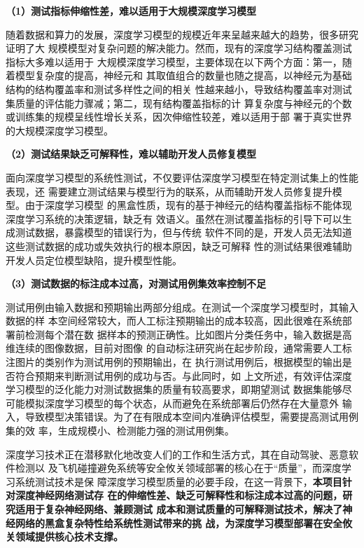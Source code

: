 \textbf{（1）测试指标伸缩性差，难以适用于大规模深度学习模型}

随着数据和算力的发展，深度学习模型的规模近年来呈越来越大的趋势，很多研究证明了大
规模模型对复杂问题的解决能力。然而，现有的深度学习结构覆盖测试指标大多难以适用于
大规模深度学习模型，主要体现在以下两个方面：第一，随着模型复杂度的提高，神经元和
其取值组合的数量也随之提高，以神经元为基础结构的结构覆盖率和测试多样性之间的相关
性越来越小，导致结构覆盖率对测试集质量的评估能力骤减；第二，现有结构覆盖指标的计
算复杂度与神经元的个数或训练集的规模呈线性增长关系，因次伸缩性较差，难以适用于部
署于真实世界的大规模深度学习模型。


\textbf{（2）测试结果缺乏可解释性，难以辅助开发人员修复模型}

面向深度学习模型的系统性测试，不仅要评估深度学习模型在特定测试集上的性能表现，还
需要建立测试结果与模型行为的联系，从而辅助开发人员修复提升模型。由于深度学习模型
的黑盒性质，现有的基于神经元的结构覆盖指标不能体现深度学习系统的决策逻辑，缺乏有
效语义。虽然在测试覆盖指标的引导下可以生成测试数据，暴露模型的错误行为，但与传统
软件不同的是，开发人员无法知道这些测试数据的成功或失效执行的根本原因，缺乏可解释
性的测试结果很难辅助开发人员定位模型缺陷，提升模型性能。

\textbf{（3）测试数据的标注成本过高，对测试用例集效率控制不足}

测试用例由输入数据和预期输出两部分组成。在测试一个深度学习模型时，其输入数据的样
本空间经常较大，而人工标注预期输出的成本较高，因此很难在系统部署前检测每个潜在数
据样本的预测正确性。比如图片分类任务中，输入数据是高维连续的图像数据，目前对图像
的自动标注研究尚在起步阶段，通常需要人工标注图片的类别作为测试用例的预期输出，在
执行测试用例后，根据模型的输出是否符合预期来判断测试用例的成功与否。与此同时，如
上文所述，有效评估深度学习模型的泛化能力对测试数据集的质量有较高要求，即期望测试
数据集能够尽可能模拟深度学习模型的每个状态，从而避免在系统部署后仍然存在大量意外
输入，导致模型决策错误。为了在有限成本空间内准确评估模型，需要提高测试用例集的效
率，生成规模小、检测能力强的测试用例集。


深度学习技术正在潜移默化地改变人们的工作和生活方式，其在自动驾驶、恶意软件检测以
及飞机碰撞避免系统等安全攸关领域部署的核心在于“质量”，而深度学习系统测试技术是保
障深度学习模型质量的必要手段，在这一背景下，\textbf{本项目针对深度神经网络测试存
在的伸缩性差、缺乏可解释性和标注成本过高的问题，研究适用于复杂神经网络、兼顾测试
成本和测试质量的可解释测试技术，解决了神经网络的黑盒复杂特性给系统性测试带来的挑
战，为深度学习模型部署在安全攸关领域提供核心技术支撑。}


